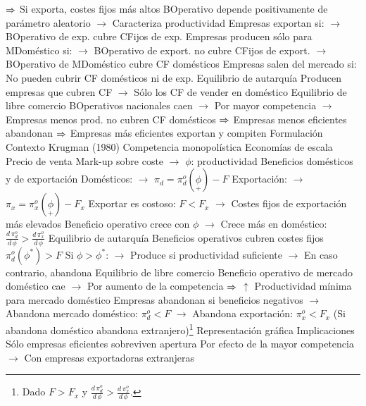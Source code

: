 \documentclass{nuevotema}
\begin{document}
\begin{esquemal}
				\4[] $\Rightarrow$ Si exporta, costes fijos más altos
				\4[] BOperativo depende positivamente de parámetro aleatorio
				\4[] $\to$ Caracteriza productividad
				\4[] Empresas exportan si:
				\4[] $\to$ BOperativo de exp. cubre CFijos de exp.
				\4[] Empresas producen sólo para MDoméstico si:
				\4[] $\to$ BOperativo de export. no cubre CFijos de export.
				\4[] $\to$ BOperativo de MDoméstico cubre CF domésticos
				\4 Empresas salen del mercado si:
				\4[] No pueden cubrir CF domésticos ni de exp.
				\4 Equilibrio de autarquía
				\4[] Producen empresas que cubren CF
				\4[] $\to$ Sólo los CF de vender en doméstico
				\4 Equilibrio de libre comercio
				\4[] BOperativos nacionales caen
				\4[] $\to$ Por mayor competencia
				\4[] $\to$ Empresas menos prod. no cubren CF domésticos
				\4[] $\Rightarrow$ Empresas menos eficientes abandonan
				\4[] $\Rightarrow$ Empresas más eficientes exportan y compiten
			\3 Formulación
				\4 Contexto Krugman (1980)
				\4[] Competencia monopolística
				\4[] Economías de escala
				\4 Precio de venta
				\4[] Mark-up sobre coste
				\4[] 
				\4[] $\to$ $\phi$: productividad
				\4 Beneficios domésticos y de exportación
				\4[] Domésticos:
				\4[] $\to$ $\pi_d = \pi_d^o(\underset{+}{\phi}) - F$
				\4[] Exportación:
				\4[] $\to$ $\pi_x = \pi_x^o(\underset{+}{\phi}) - F_x$
				\4[] Exportar es costoso: $F < F_x$
				\4[] $\to$ Costes fijos de exportación más elevados
				\4[] Beneficio operativo crece con $\phi$
				\4[] $\to$ Crece más en doméstico: $\frac{d \, \pi_d^o}{d \, \phi} > \frac{d \, \pi_x^o}{d \, \phi}$
				\4 Equilibrio de autarquía
				\4[] Beneficios operativos cubren costes fijos $\pi_d^o (\phi^*) > F$
				\4[] Si $\phi > \phi^*$:
				\4[] $\to$ Produce si productividad suficiente
				\4[] $\to$ En caso contrario, abandona
				\4 Equilibrio de libre comercio
				\4[] Beneficio operativo de mercado doméstico cae
				\4[] $\to$ Por aumento de la competencia
				\4[] $\Rightarrow$ $\uparrow$ Productividad mínima para mercado doméstico
				\4[] Empresas abandonan si beneficios negativos
				\4[] $\to$ Abandona mercado doméstico: $\pi_d^o < F$
				\4[] $\to$ Abandona exportación: $\pi_x^o < F_x$
				\4[] (Si abandona doméstico abandona extranjero)\footnote{Dado $F > F_x$ y $\frac{d \, \pi_d^o}{d \, \phi} > \frac{d \, \pi_x^o}{d \, \phi}$.}
				\4 Representación gráfica
				\4[] 
			\3 Implicaciones
				\4 Sólo empresas eficientes sobreviven apertura
				\4[] Por efecto de la mayor competencia
				\4[] $\to$ Con empresas exportadoras extranjeras

\end{esquemal}
\end{document}
